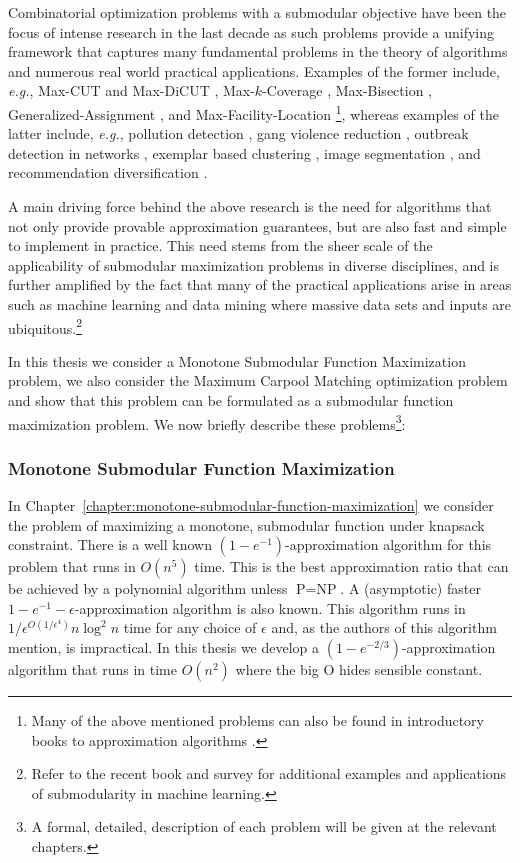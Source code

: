 Combinatorial optimization problems with a submodular objective have been the focus of intense research in the last decade as such problems provide a unifying framework that captures many fundamental problems in the theory of algorithms and numerous real world practical applications.
Examples of the former include, {\em e.g.}, Max-CUT and Max-DiCUT \cite{FG95,GW95,HZ01,H01,K72,KKMO07,LLZ02,TSSW00}, Max-$k$-Coverage \cite{F98,SW11,V01}, Max-Bisection \cite{ABG13,FJ97,HZ02,Y01}, Generalized-Assignment \cite{CK05,CKR06,FGMS06,FV06}, and Max-Facility-Location \cite{AS99,CFN77a,CFN77b}\footnote{Many of the above mentioned problems can also be found in introductory books to approximation algorithms \cite{SW11,V01}.}, whereas examples of the latter include, {\em e.g.}, pollution detection \cite{KLGVF08}, gang violence reduction \cite{SSPB14}, outbreak detection in networks \cite{LKGFFVG07}, exemplar based clustering \cite{GK10}, image segmentation \cite{KXFK11}, and recommendation diversification \cite{YG11}.

A main driving force behind the above research is the need for algorithms that not only provide provable approximation guarantees, but are also fast and  simple to implement in practice.
This need stems from the sheer scale of the applicability of submodular maximization problems in diverse disciplines, and is further amplified by the fact that many of the practical applications arise in areas such as machine learning and data mining where massive data sets and inputs are ubiquitous.\footnote{Refer to the recent book \cite{B13} and survey \cite{KG14} for additional examples and applications of submodularity in machine learning.}

In this thesis we consider a Monotone Submodular Function Maximization problem, we also consider the Maximum Carpool Matching optimization problem and show that this problem can be formulated as a submodular function maximization problem.
We now briefly describe these problems\footnote{A formal, detailed, description of each problem will be given at the relevant chapters.}:

\subsubsection*{Monotone Submodular Function Maximization} 
In Chapter~\ref{chapter:monotone-submodular-function-maximization} we consider the problem of maximizing a monotone, submodular function under knapsack constraint.
There is a well known $(1-e^{-1})$-approximation algorithm for this problem that runs in $O(n^5)$ time.
This is the best approximation ratio that can be achieved by a polynomial algorithm unless $\text{P} = \text{NP}$.
A (asymptotic) faster $1 - e^{-1} - \epsilon$-approximation algorithm is also known.
This algorithm runs in $1/\epsilon^{O(1/\epsilon^4)}n\log^2n$ time for any choice of $\epsilon$ and, as the authors of this algorithm mention, is impractical.
In this thesis we develop a $(1-e^{-2/3})$-approximation algorithm that runs in time $O(n^2)$ where the big O hides sensible constant.


